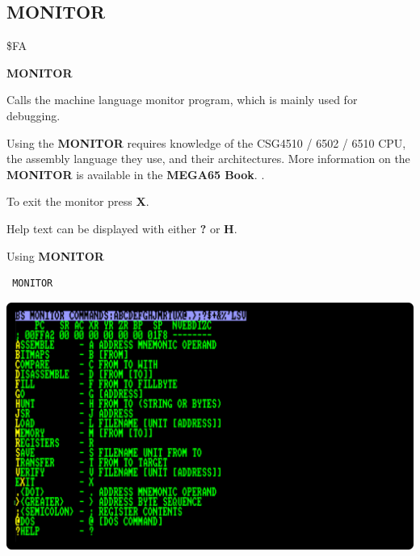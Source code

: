 
\newpage
\subsection{MONITOR}
\begin{description}[leftmargin=2cm,style=nextline]
\item [Token:] \$FA
\item [Format:] {\bf MONITOR}
\item [Usage:]  Calls the machine language
                monitor program, which is mainly used for
                debugging.

\item [Remarks:] Using the {\bf MONITOR} requires knowledge
                 of the CSG4510 / 6502 / 6510 CPU,
                 the assembly language they use, and their
                 architectures. More information on the
                 {\bf MONITOR} is available in
\ifdefined\printmanual
the {\bf MEGA65 Book}.
\else
{}.
\fi

                 To exit the monitor press {\bf X}.

                 Help text can be displayed with either {\bf ?} or {\bf H}.

\item [Example:] Using {\bf MONITOR}
\begin{tcolorbox}[colback=black,coltext=white]
\verbatimfont{\codefont}
\begin{verbatim}
 MONITOR
\end{verbatim}
\end{tcolorbox}
\item \begin{center}\includegraphics[width=0.8\linewidth]{images/monitor-h.png}\end{center}
\end{description}

